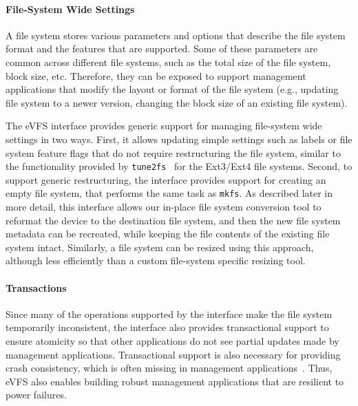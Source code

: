 \vspace{-0.25em}
\paragraph{File-System Wide Settings} A file system stores various parameters and options that describe the file system format and the features that are supported. Some of these parameters are common across different file systems, such as the total size of the file system, block size, etc. Therefore, they can be exposed to support management applications that modify the layout or format of the file system (e.g., updating file system to a newer version, changing the block size of an existing file system).

The eVFS interface provides generic support for managing file-system wide settings in two ways. First, it allows updating simple settings such as labels or file system feature flags that do not require restructuring the file system, similar to the functionality provided by \texttt{tune2fs}~\cite{tso-e2fsprogs} for the Ext3/Ext4 file systems. Second, to support generic restructuring, the interface provides support for creating an empty file system, that performs the same task as \texttt{mkfs}. As described later in more detail, this interface allows our in-place file system conversion tool to reformat the device to the destination file system, and then the new file system metadata can be recreated, while keeping the file contents of the existing file system intact. Similarly, a file system can be resized using this approach, although less efficiently than a custom file-system specific resizing tool.

\vspace{-0.25em}
\paragraph{Transactions} Since many of the operations supported by the interface make the file system temporarily inconsistent, the interface also provides transactional support to ensure atomicity so that other applications do not see partial updates made by management applications. Transactional support is also necessary for providing crash consistency, which is often missing in management applications~\cite{gatla2018fsck}. Thus, eVFS also enables building robust management applications that are resilient to power failures.


